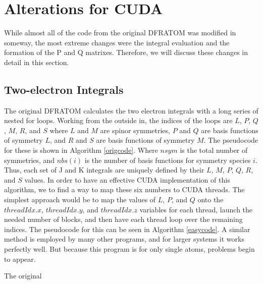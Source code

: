 \documentclass[12pt]{book}
\begin{document}
\section{Alterations for CUDA}
While almost all of the code from the original DFRATOM was modified in someway, the most extreme changes were the integral evaluation and the formation of the P and Q matrixes. Therefore, we will discuss these changes in detail in this section.

\subsection{Two-electron Integrals}
The original DFRATOM calculates the two electron integrals with a long series of nested for loops. Working from the outside in, the indices of the loops are $L$, $P$, $Q$, $M$, $R$, and $S$ where $L$ and $M$ are spinor symmetries, $P$ and $Q$ are basis functions of symmetry $L$, and $R$ and $S$ are basis functions of symmetry $M$. The pseudocode for these is shown in Algorithm \ref{origcode}. Where $nsym$ is the total number of symmetries, and $nbs(i)$ is the number of basis functions for symmetry species $i$. Thus, each set of J and K integrals are uniquely defined by their $L$, $M$, $P$, $Q$, $R$, and $S$ values. In order to have an effective CUDA implementation of this algorithm, we to find a way to map these six numbers to CUDA threads. The simplest approach would be to map the values of $L$, $P$, and $Q$ onto the $threadIdx.x$, $threadIdx.y$, and $threadIdx.z$ variables for each thread, launch the needed number of blocks, and then have each thread loop over the remaining indices. The pseudocode for this can be seen in Algorithm \ref{easycode}. A similar method is employed by many other programs, and for larger systems it works perfectly well. But because this program is for only single atoms, problems begin to appear.

\begin{algorithm}
\caption{The original }
\label{origcode}
\begin{algorithmic}
				\ELSE
				\ENDIF
					\ELSE
					\ENDIF
					\ENDFOR
				\ENDFOR
			\ENDFOR
		\ENDFOR
	\ENDFOR
\ENDFOR
\end{algorithmic}
\end{algorithm}
\end{document}
